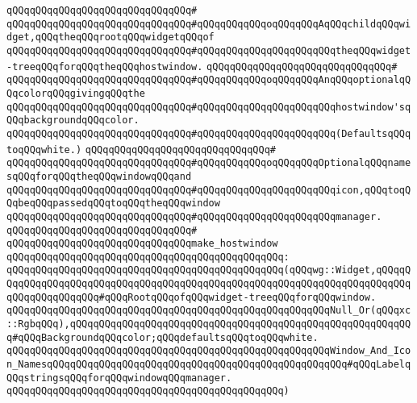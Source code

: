 \verb|qQQqqQQqqQQqqQQqqQQqqQQqqQQqqQQq#|\newline
\verb|qQQqqQQqqQQqqQQqqQQqqQQqqQQqqQQq#qQQqqQQqqQQqoqQQqqQQqAqQQqchildqQQqwidget,qQQqtheqQQqrootqQQqwidgetqQQqof|\newline
\verb|qQQqqQQqqQQqqQQqqQQqqQQqqQQqqQQq#qQQqqQQqqQQqqQQqqQQqqQQqtheqQQqwidget-treeqQQqforqQQqtheqQQqhostwindow.|\newline
\verb|qQQqqQQqqQQqqQQqqQQqqQQqqQQqqQQq#|\newline
\verb|qQQqqQQqqQQqqQQqqQQqqQQqqQQqqQQq#qQQqqQQqqQQqoqQQqqQQqAnqQQqoptionalqQQqcolorqQQqgivingqQQqthe|\newline
\verb|qQQqqQQqqQQqqQQqqQQqqQQqqQQqqQQq#qQQqqQQqqQQqqQQqqQQqqQQqhostwindow'sqQQqbackgroundqQQqcolor.|\newline
\verb|qQQqqQQqqQQqqQQqqQQqqQQqqQQqqQQq#qQQqqQQqqQQqqQQqqQQqqQQq(DefaultsqQQqtoqQQqwhite.)|\newline
\verb|qQQqqQQqqQQqqQQqqQQqqQQqqQQqqQQq#|\newline
\verb|qQQqqQQqqQQqqQQqqQQqqQQqqQQqqQQq#qQQqqQQqqQQqoqQQqqQQqOptionalqQQqnamesqQQqforqQQqtheqQQqwindowqQQqand|\newline
\verb|qQQqqQQqqQQqqQQqqQQqqQQqqQQqqQQq#qQQqqQQqqQQqqQQqqQQqqQQqicon,qQQqtoqQQqbeqQQqpassedqQQqtoqQQqtheqQQqwindow|\newline
\verb|qQQqqQQqqQQqqQQqqQQqqQQqqQQqqQQq#qQQqqQQqqQQqqQQqqQQqqQQqmanager.|\newline
\verb|qQQqqQQqqQQqqQQqqQQqqQQqqQQqqQQq#|\newline
\verb|qQQqqQQqqQQqqQQqqQQqqQQqqQQqqQQqmake_hostwindow|\newline
\verb|qQQqqQQqqQQqqQQqqQQqqQQqqQQqqQQqqQQqqQQqqQQqqQQq:|\newline
\verb|qQQqqQQqqQQqqQQqqQQqqQQqqQQqqQQqqQQqqQQqqQQqqQQq(qQQqwg::Widget,qQQqqQQqqQQqqQQqqQQqqQQqqQQqqQQqqQQqqQQqqQQqqQQqqQQqqQQqqQQqqQQqqQQqqQQqqQQqqQQqqQQqqQQqqQQq#qQQqRootqQQqofqQQqwidget-treeqQQqforqQQqwindow.|\newline
\verb|qQQqqQQqqQQqqQQqqQQqqQQqqQQqqQQqqQQqqQQqqQQqqQQqqQQqqQQqNull_Or(qQQqxc::RgbqQQq),qQQqqQQqqQQqqQQqqQQqqQQqqQQqqQQqqQQqqQQqqQQqqQQqqQQqqQQqqQQq#qQQqBackgroundqQQqcolor;qQQqdefaultsqQQqtoqQQqwhite.|\newline
\verb|qQQqqQQqqQQqqQQqqQQqqQQqqQQqqQQqqQQqqQQqqQQqqQQqqQQqqQQqWindow_And_Icon_NamesqQQqqQQqqQQqqQQqqQQqqQQqqQQqqQQqqQQqqQQqqQQqqQQqqQQq#qQQqLabelqQQqstringsqQQqforqQQqwindowqQQqmanager.|\newline
\verb|qQQqqQQqqQQqqQQqqQQqqQQqqQQqqQQqqQQqqQQqqQQqqQQq)|\newline
